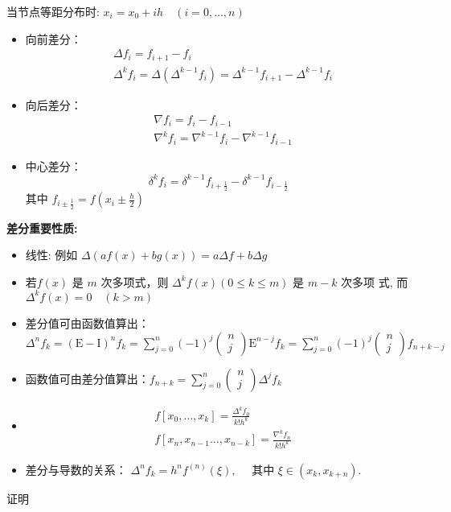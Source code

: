当节点等距分布时: $x_{i}=x_{0}+i h \quad(i=0, \ldots, n)$
\begin{itemize}
\item 向前差分： 
  $$
  \begin{aligned}
  &\Delta f_{i}=f_{i+1}-f_{i} \\
  &\Delta^{k} f_{i}=\Delta\left(\Delta^{k-1} f_{i}\right)=\Delta^{k-1} f_{i+1}-\Delta^{k-1} f_{i}
  \end{aligned}
  $$
\item 向后差分： 
  $$
  \begin{aligned}
  &\nabla f_{i}=f_{i}-f_{i-1} \\
  &\nabla^{k} f_{i}=\nabla^{k-1} f_{i}-\nabla^{k-1} f_{i-1}
  \end{aligned}
  $$
\item 中心差分：
  $$
  \delta^{k} f_{i}=\delta^{k-1} f_{i+\frac{1}{2}}-\delta^{k-1} f_{i-\frac{1}{2}}
  $$
其中 $f_{i \pm \frac{1}{2}}=f\left(x_{i} \pm \frac{h}{2}\right)$
\end{itemize}

\textbf{差分重要性质:}
\begin{itemize}
  \item 线性: 例如 $\Delta(a f(x)+b g(x))=a \Delta f+b \Delta g$
  \item 若$f(x)$ 是 $m$ 次多项式，则 $\Delta^{k} f(x)(0 \leq k \leq m)$ 是 $m-k$ 次多项 式, 而 $\Delta^{k} f(x)=0 \quad(k>m)$
  \item 差分值可由函数值算出：\\
    $\Delta^{n} f_{k}=(\mathrm{E}-\mathrm{I})^{n} f_{k}=\sum_{j=0}^{n}(-1)^{j}\left(\begin{array}{l}n \\ j\end{array}\right) \mathrm{E}^{n-j} f_{k}=\sum_{j=0}^{n}(-1)^{j}\left(\begin{array}{l}n \\ j\end{array}\right) f_{n+k-j}$
  \item 函数值可由差分值算出：$f_{n+k}=\sum_{j=0}^{n}\left(\begin{array}{l}n \\ j\end{array}\right) \Delta^{j} f_{k}$
  \item
  $$
  \begin{aligned}
  &f\left[x_{0}, \ldots, x_{k}\right]=\frac{\Delta^{k} f_{0}}{k ! h^{k}} \\
  &f\left[x_{n}, x_{n-1} \ldots, x_{n-k}\right]=\frac{\nabla^{k} f_{n}}{k ! h^{k}}
  \end{aligned}
  $$
  \item 差分与导数的关系： $\Delta^{n} f_{k}=h^{n} f^{(n)}(\xi), \quad$ 其中 $\xi \in\left(x_{k}, x_{k+n}\right) .$
\end{itemize}
\begin{note}
  证明
\end{note}

